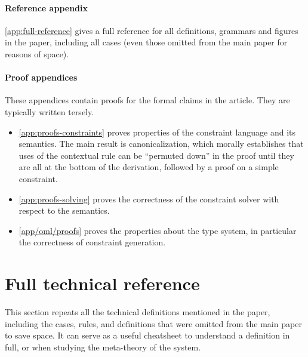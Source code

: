\documentclass[acmsmall,screen,nonacm%
\Anonymous{,anonymous}{}%
\Final{}{,review}%
]{acmart}
\begin{document}
\paragraph{Reference appendix}
\cref{app:full-reference} gives a full reference for all
  definitions, grammars and figures in the paper, including all cases
  (even those omitted from the main paper for reasons of space).

\paragraph{Proof appendices} These appendices contain proofs for the
formal claims in the article. They are typically written tersely.
\begin{itemize}
\item \cref{app:proofs-constraints} proves properties of the
  constraint language and its semantics. The main result is
  canonicalization, which morally establishes that uses of the
  contextual rule  can be ``permuted down'' in the
  proof until they are all at the bottom of the derivation, followed
  by a proof on a simple constraint.
\item \cref{app:proofs-solving} proves the correctness of the
  constraint solver with respect to the semantics.
\item \cref{app/oml/proofs} proves the properties about the \OML
  type system, in particular the correctness of constraint generation.
\end{itemize}

\clearpage
\section{Full technical reference}
\label{appendix:figures}
\label{app:full-reference}

This section repeats all the technical definitions mentioned in the paper,
including the cases, rules, and definitions that were omitted from the main
paper to save space. It can serve as a useful cheatsheet to understand a
definition in full, or when studying the meta-theory of the system.
\end{document}
